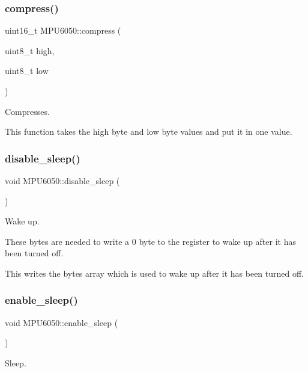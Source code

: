 \subsubsection{\texorpdfstring{compress()}{compress()}}
{\footnotesize\ttfamily uint16\+\_\+t M\+P\+U6050\+::compress (\begin{DoxyParamCaption}\item[{uint8\+\_\+t}]{high,  }\item[{uint8\+\_\+t}]{low }\end{DoxyParamCaption})}



Compresses. 

This function takes the high byte and low byte values and put it in one value. \mbox{\label{classMPU6050_a65c24f3e10f6833cda834d6c892a7e97}} 
\subsubsection{\texorpdfstring{disable\+\_\+sleep()}{disable\_sleep()}}
{\footnotesize\ttfamily void M\+P\+U6050\+::disable\+\_\+sleep (\begin{DoxyParamCaption}{ }\end{DoxyParamCaption})}



Wake up. 

These bytes are needed to write a 0 byte to the register to wake up after it has been turned off.

This writes the bytes array which is used to wake up after it has been turned off. \mbox{\label{classMPU6050_ad980ebc85c0e817561d1fcf5eaa9deaf}} 
\subsubsection{\texorpdfstring{enable\+\_\+sleep()}{enable\_sleep()}}
{\footnotesize\ttfamily void M\+P\+U6050\+::enable\+\_\+sleep (\begin{DoxyParamCaption}{ }\end{DoxyParamCaption})}



Sleep. 

